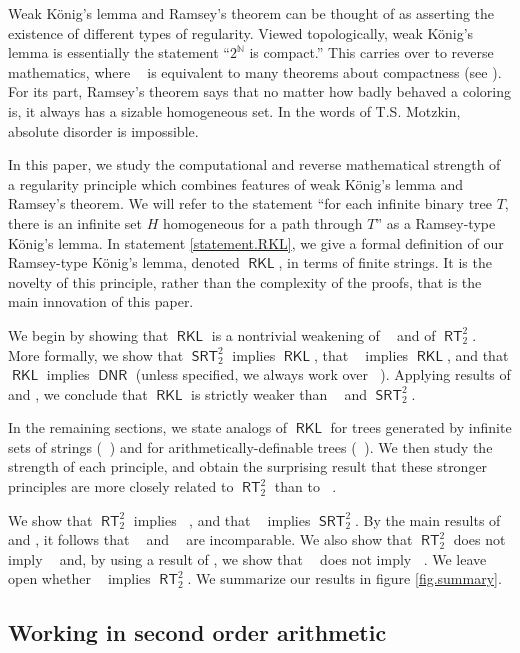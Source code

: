 \documentclass{amsart}
\theoremstyle{plain}
\theoremstyle{remark}
\theoremstyle{definition}
\DeclareMathOperator{\RCA}{\mathsf{RCA}_0}
\DeclareMathOperator{\RT}{\mathsf{RT}}
\DeclareMathOperator{\SRT}{\mathsf{SRT}}
\DeclareMathOperator{\DNR}{\mathsf{DNR}}
\DeclareMathOperator{\WKL}{\mathsf{WKL}_0}
\DeclareMathOperator{\RKL}{\mathsf{RKL}}
\DeclareMathOperator{\RKLp}{\mathsf{RKL}^{(1)}}
\DeclareMathOperator{\RKLa}{\mathsf{RKL}^{(<\omega)}}
\DeclareMathOperator{\N}{\mathbb{N}}
\begin{document}
	Weak K\"onig's lemma and Ramsey's theorem can be thought of as asserting the existence of different types of regularity.  
	Viewed topologically, weak K\"onig's lemma is essentially the statement ``$2^{\N}$ is compact.''  This carries over to reverse mathematics, where $\WKL$ is equivalent to many theorems about compactness (see \cite{simpson}). 
	For its part, Ramsey's theorem says that no matter how badly behaved a coloring is, it always has a sizable homogeneous set.  In the words of T.S. Motzkin, absolute disorder is impossible.  

\bigskip
	In this paper, we study the computational and reverse mathematical strength of a regularity principle which combines features of weak K\"onig's lemma and Ramsey's theorem.   
	We will refer to the statement ``for each infinite binary tree $T$, there is an infinite set $H$ homogeneous for a path through $T$'' as a Ramsey-type K\"onig's lemma.  
	In statement \ref{statement.RKL}, we give a formal definition of our Ramsey-type K\"onig's lemma, denoted $\RKL$, in terms of finite strings.
	It is the novelty of this principle, rather than the complexity of the proofs, that is the main innovation of this paper.  

	We begin by showing that $\RKL$ is a nontrivial weakening of $\WKL$ and of $\RT^2_2$.  
	More formally, we show that $\SRT^2_2$ implies $\RKL$, that $\WKL$ implies $\RKL$, and that $\RKL$ implies $\DNR$ 
		(unless specified, we always work over $\RCA$).
	Applying results of \cite{CJS} and \cite{liu}, we conclude that $\RKL$ is strictly weaker than $\WKL$ and $\SRT^2_2$.

	In the remaining sections, we state analogs of $\RKL$ for trees generated by infinite sets of strings  ($\RKLp$) and for arithmetically-definable trees ($\RKLa$).  We then study the strength of each principle, and obtain the surprising result that these stronger principles are more closely related to $\RT^2_2$ than to $\WKL$.
	
	We show that $\RT^2_2$ implies $\RKLp$, and that $\RKLp$ implies $\SRT^2_2$.  
	By the main results of \cite{D22-no-low} and \cite{liu}, it follows that $\RKLp$ and $\WKL$ are incomparable.  
	We also show that $\RT^2_2$ does not imply $\RKLa$ and, by using a result of \cite{liu}, we show that $\RKLa$ does not imply $\WKL$.  
	We leave open whether $\RKLa$ implies $\RT^2_2$.
	We summarize our results in figure \ref{fig.summary}.

\subsection{Working in second order arithmetic}
\end{document}
